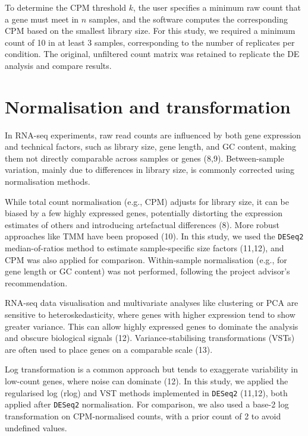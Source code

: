 \documentclass[
  a4paper,
]{scrreprt}
\begin{document}
To determine the CPM threshold \(k\), the user specifies a minimum raw
count that a gene must meet in \(n\) samples, and the software computes
the corresponding CPM based on the smallest library size. For this
study, we required a minimum count of 10 in at least 3 samples,
corresponding to the number of replicates per condition. The original,
unfiltered count matrix was retained to replicate the DE analysis and
compare results.

\section{Normalisation and transformation}\label{sec-norm}

In RNA-seq experiments, raw read counts are influenced by both gene
expression and technical factors, such as library size, gene length, and
GC content, making them not directly comparable across samples or genes
(8,9). Between-sample variation, mainly due to differences in library
size, is commonly corrected using normalisation methods.

While total count normalisation (e.g., CPM) adjusts for library size, it
can be biased by a few highly expressed genes, potentially distorting
the expression estimates of others and introducing artefactual
differences (8). More robust approaches like TMM have been proposed
(10). In this study, we used the \texttt{DESeq2} median-of-ratios method
to estimate sample-specific size factors (11,12), and CPM was also
applied for comparison. Within-sample normalisation (e.g., for gene
length or GC content) was not performed, following the project advisor's
recommendation.

RNA-seq data visualisation and multivariate analyses like clustering or
PCA are sensitive to heteroskedasticity, where genes with higher
expression tend to show greater variance. This can allow highly
expressed genes to dominate the analysis and obscure biological signals
(12). Variance-stabilising transformations (VSTs) are often used to
place genes on a comparable scale (13).

Log transformation is a common approach but tends to exaggerate
variability in low-count genes, where noise can dominate (12). In this
study, we applied the regularised log (rlog) and VST methods implemented
in \texttt{DESeq2} (11,12), both applied after \texttt{DESeq2}
normalisation. For comparison, we also used a base-2 log transformation
on CPM-normalised counts, with a prior count of 2 to avoid undefined
values.
\end{document}
